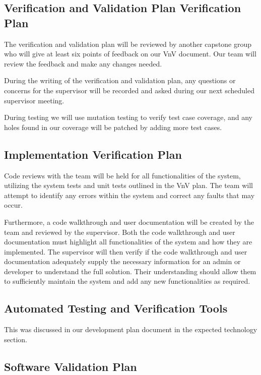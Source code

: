 \documentclass[12pt, titlepage]{article}
\begin{document}
\subsection{Verification and Validation Plan Verification Plan}

The verification and validation plan will be reviewed by another capstone
group who will give at least six points of feedback on our VnV document. Our
team will review the feedback and make any changes needed. 

During the writing of the verification and validation plan, any questions or
concerns for the supervisor will be recorded and asked during our next
scheduled supervisor meeting.

During testing we will use mutation testing to verify test case coverage, and
any holes found in our coverage will be patched by adding more test cases.

\subsection{Implementation Verification Plan}

Code reviews with the team will be held for all functionalities of the system, utilizing the
system tests and unit tests outlined in the VnV plan. The team will attempt to identify any
errors within the system and correct any faults that may occur.

Furthermore, a code walkthrough and user documentation will be created by the team and
reviewed by the supervisor. Both the code walkthrough and user documentation must highlight
all functionalities of the system and how they are implemented. The supervisor will then
verify if the code walkthrough and user documentation adequately supply the necessary
information for an admin or developer to understand the full solution. Their understanding
should allow them to sufficiently maintain the system and add any new functionalities as
required.

\subsection{Automated Testing and Verification Tools}

This was discussed in our development plan document \cite{DP} 
in the expected technology section.

\subsection{Software Validation Plan}
\end{document}
